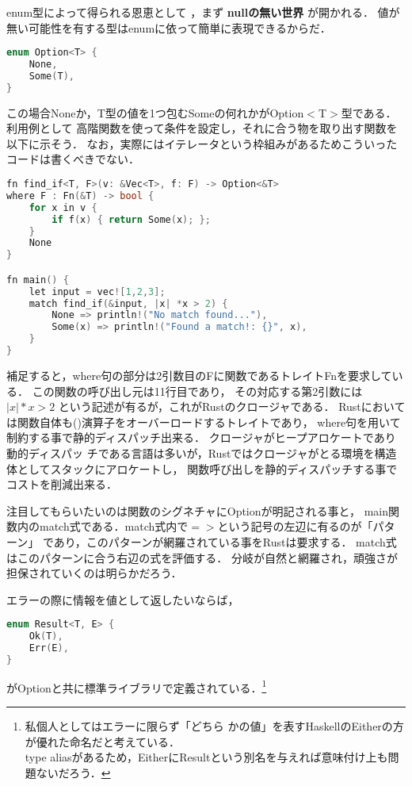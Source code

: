 enum型によって得られる恩恵として
，まず \textbf{nullの無い世界} が開かれる．
値が無い可能性を有する型はenumに依って簡単に表現できるからだ．

\begin{lstlisting}[language={C++},caption=Option型,label=option_t]
enum Option<T> {
    None,
    Some(T),
}
\end{lstlisting}

この場合Noneか，T型の値を1つ包むSomeの何れかがOption$<$T$>$型である．
利用例として
高階関数を使って条件を設定し，それに合う物を取り出す関数を以下に示そう．
なお，実際にはイテレータという枠組みがあるためこういったコードは書くべきでない．

\begin{lstlisting}[language={C++},caption=条件に応じた値が見つかれば返す関数,label=find_if]
fn find_if<T, F>(v: &Vec<T>, f: F) -> Option<&T>
where F : Fn(&T) -> bool {
    for x in v {
        if f(x) { return Some(x); };
    }
    None
}

fn main() {
    let input = vec![1,2,3];
    match find_if(&input, |x| *x > 2) {
        None => println!("No match found..."),
        Some(x) => println!("Found a match!: {}", x),
    }
}
\end{lstlisting}

補足すると，where句の部分は2引数目のFに関数であるトレイトFnを要求している．
この関数の呼び出し元は11行目であり，
その対応する第2引数には $|x| *x > 2$ という記述が有るが，これがRustのクロージャである．
Rustにおいては関数自体も()演算子をオーバーロードするトレイトであり，
where句を用いて制約する事で静的ディスパッチ出来る．
クロージャがヒープアロケートであり動的ディスパッ
チである言語は多いが，Rustではクロージャがとる環境を構造体としてスタックにアロケートし，
関数呼び出しを静的ディスパッチする事でコストを削減出来る．

注目してもらいたいのは関数のシグネチャにOptionが明記される事と，
main関数内のmatch式である．match式内で$=>$という記号の左辺に有るのが「パターン」
であり，このパターンが網羅されている事をRustは要求する．
match式はこのパターンに合う右辺の式を評価する．
分岐が自然と網羅され，頑強さが担保されていくのは明らかだろう．

エラーの際に情報を値として返したいならば，

\begin{lstlisting}[language={C++},caption=Result型,label=result_t]
enum Result<T, E> {
    Ok(T),
    Err(E),
}
\end{lstlisting}

がOptionと共に標準ライブラリで定義されている．\footnote{私個人としてはエラーに限らず「どちら
  かの値」を表すHaskellのEitherの方が優れた命名だと考えている． \\
  type aliasがあるため，EitherにResultという別名を与えれば意味付け上も問題ないだろう．}

